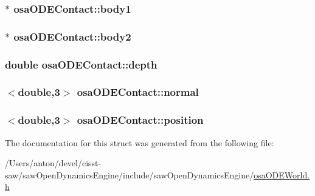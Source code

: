 \subsubsection[{body1}]{$\ast$ osa\+O\+D\+E\+Contact\+::body1}\label{structosa_o_d_e_contact_ae89beddf59923facc7abce1c1f9ce2a8}
\hypertarget{structosa_o_d_e_contact_a1148b4a03a82bf9f7155b4e7a7536739}{}
\subsubsection[{body2}]{$\ast$ osa\+O\+D\+E\+Contact\+::body2}\label{structosa_o_d_e_contact_a1148b4a03a82bf9f7155b4e7a7536739}
\hypertarget{structosa_o_d_e_contact_a6c133096ca9fd520047a636656c50126}{}
\subsubsection[{depth}]{\setlength{\rightskip}{0pt plus 5cm}double osa\+O\+D\+E\+Contact\+::depth}\label{structosa_o_d_e_contact_a6c133096ca9fd520047a636656c50126}
\hypertarget{structosa_o_d_e_contact_a13e7c6b7b860f7b0744121d413929807}{}
\subsubsection[{normal}]{$<$double,3$>$ osa\+O\+D\+E\+Contact\+::normal}\label{structosa_o_d_e_contact_a13e7c6b7b860f7b0744121d413929807}
\hypertarget{structosa_o_d_e_contact_aec71f90b8053631cb8d51b2eb375a266}{}
\subsubsection[{position}]{$<$double,3$>$ osa\+O\+D\+E\+Contact\+::position}\label{structosa_o_d_e_contact_aec71f90b8053631cb8d51b2eb375a266}


The documentation for this struct was generated from the following file\+:\begin{DoxyCompactItemize}
\item 
/\+Users/anton/devel/cisst-\/saw/saw\+Open\+Dynamics\+Engine/include/saw\+Open\+Dynamics\+Engine/\hyperlink{osa_o_d_e_world_8h}{osa\+O\+D\+E\+World.\+h}\end{DoxyCompactItemize}
